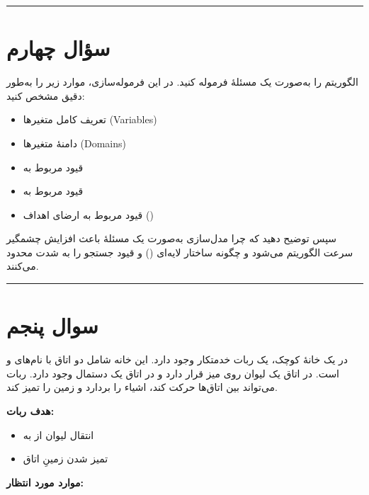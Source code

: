 \documentclass[a4paper,10pt]{article}
\begin{document}
\bigskip
\rule{\linewidth}{0.4pt}

\section{سؤال چهارم}

الگوریتم  را به‌صورت یک مسئلهٔ 
فرموله کنید.  
در این فرموله‌سازی، موارد زیر را به‌طور دقیق مشخص کنید:

\begin{itemize}
    \item تعریف کامل متغیرها (Variables)
    \item دامنهٔ متغیرها (Domains)
    \item قیود مربوط به 
    \item قیود مربوط به 
    \item قیود مربوط به ارضای اهداف ()
\end{itemize}

\noindent
سپس توضیح دهید که چرا مدل‌سازی  به‌صورت یک مسئلهٔ 
باعث افزایش چشمگیر سرعت الگوریتم می‌شود و چگونه 
ساختار لایه‌ای () و قیود 
جستجو را به شدت محدود می‌کنند.

\bigskip
\bigskip
\rule{\linewidth}{0.4pt}

\section{سوال پنجم}

در یک خانهٔ کوچک، یک ربات ‌خدمتکار وجود دارد. این خانه شامل دو اتاق با نام‌های
 و  است. در اتاق  یک لیوان روی میز قرار دارد و
در اتاق  یک دستمال وجود دارد. ربات می‌تواند بین اتاق‌ها حرکت کند،
اشیاء را بردارد و زمین را تمیز کند.

\bigskip

\noindent
\textbf{هدف ربات:}
\begin{itemize}
    \item انتقال لیوان از  به 
    \item تمیز شدن زمینِ اتاق 
\end{itemize}

\bigskip

\noindent
\textbf{موارد مورد انتظار:}
\end{document}
